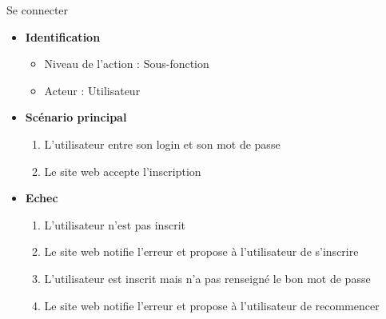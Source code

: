 \documentclass[9pt,xcolor=dvipsnames]{beamer}
\begin{document}
\begin{frame}{Se connecter}
  \hfill
  \begin{minipage}{0.5\textwidth}
    \begin{flushright}
      \begin{itemize} 
      \item \textbf{Identification} 
        \begin{itemize} 
        \item[] Niveau de l'action : Sous-fonction 
        \item[] Acteur : Utilisateur 
        \end{itemize} 
      \item \textbf{Scénario principal} 
        \begin{enumerate} 
        \item L'utilisateur entre son login et son mot de passe 
        \item Le site web accepte l'inscription 
        \end{enumerate} 
      \item \textbf{Echec} 
        \begin{enumerate} 
        \item L'utilisateur n'est pas inscrit 
        \item Le site web notifie l'erreur et propose à l'utilisateur de s'inscrire 
        \item L'utilisateur est inscrit mais n'a pas renseigné le bon mot de passe 
        \item Le site web notifie l'erreur et propose à l'utilisateur de recommencer 
        \end{enumerate} 
      \end{itemize}
    \end{flushright}
  \end{minipage}
\end{frame}
\end{document}
